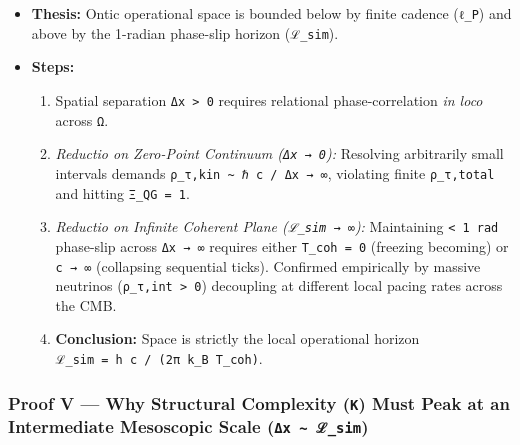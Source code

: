 \documentclass[
]{article}
\begin{document}
\begin{itemize}
\item
  \textbf{Thesis:} Ontic operational space is bounded below by finite
  cadence (\texttt{ℓ\_P}) and above by the 1-radian phase-slip horizon
  (\texttt{ℒ\_sim}).
\item
  \textbf{Steps:}

  \begin{enumerate}
  \def\labelenumi{\arabic{enumi}.}
  \item
    Spatial separation \texttt{Δx~\textgreater{}~0} requires relational
    phase-correlation \emph{in loco} across \texttt{Ω}.
  \item
    \emph{Reductio on Zero-Point Continuum (\texttt{Δx~→~0}):} Resolving
    arbitrarily small intervals demands
    \texttt{ρ\_τ,kin~\textasciitilde{}~ℏ~c~/~Δx~→~∞}, violating finite
    \texttt{ρ\_τ,total} and hitting \texttt{Ξ\_QG~=~1}.
  \item
    \emph{Reductio on Infinite Coherent Plane (\texttt{ℒ\_sim~→~∞}):}
    Maintaining \texttt{\textless{}~1~rad} phase-slip across
    \texttt{Δx~→~∞} requires either \texttt{T\_coh~=~0} (freezing
    becoming) or \texttt{c~→~∞} (collapsing sequential ticks). Confirmed
    empirically by massive neutrinos
    (\texttt{ρ\_τ,int~\textgreater{}~0}) decoupling at different local
    pacing rates across the CMB.
  \item
    \textbf{Conclusion:} Space is strictly the local operational horizon
    \texttt{ℒ\_sim~=~h~c~/~(2π~k\_B~T\_coh)}.
  \end{enumerate}
\end{itemize}

\subsubsection{\texorpdfstring{Proof V --- Why Structural Complexity
(\texttt{K}) Must Peak at an Intermediate Mesoscopic Scale
(\texttt{Δx~\textasciitilde{}~ℒ\_sim})}{Proof V --- Why Structural Complexity (K) Must Peak at an Intermediate Mesoscopic Scale (Δx~\textasciitilde~ℒ\_sim)}}\label{proof-v-why-structural-complexity-k-must-peak-at-an-intermediate-mesoscopic-scale-ux3b4x-ux2112_sim}
\end{document}
